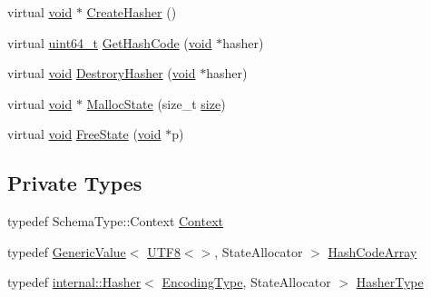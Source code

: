 \begin{DoxyCompactItemize}
\item 
virtual \hyperlink{imgui__impl__opengl3__loader_8h_ac668e7cffd9e2e9cfee428b9b2f34fa7}{void} $\ast$ \hyperlink{classGenericSchemaValidator_abc377481583ca2095fb784be88887faa}{Create\+Hasher} ()
\item 
virtual \hyperlink{stdint_8h_aec6fcb673ff035718c238c8c9d544c47}{uint64\+\_\+t} \hyperlink{classGenericSchemaValidator_ac01c45982a1f512e1ca06fe5544b0c0f}{Get\+Hash\+Code} (\hyperlink{imgui__impl__opengl3__loader_8h_ac668e7cffd9e2e9cfee428b9b2f34fa7}{void} $\ast$hasher)
\item 
virtual \hyperlink{imgui__impl__opengl3__loader_8h_ac668e7cffd9e2e9cfee428b9b2f34fa7}{void} \hyperlink{classGenericSchemaValidator_a007eef58be575dc562543d069ddd2710}{Destrory\+Hasher} (\hyperlink{imgui__impl__opengl3__loader_8h_ac668e7cffd9e2e9cfee428b9b2f34fa7}{void} $\ast$hasher)
\item 
virtual \hyperlink{imgui__impl__opengl3__loader_8h_ac668e7cffd9e2e9cfee428b9b2f34fa7}{void} $\ast$ \hyperlink{classGenericSchemaValidator_a7c999dfb3118aaa08495d60eee6d3732}{Malloc\+State} (size\+\_\+t \hyperlink{imgui__impl__opengl3__loader_8h_a3d1e3edfcf61ca2d831883e1afbad89e}{size})
\item 
virtual \hyperlink{imgui__impl__opengl3__loader_8h_ac668e7cffd9e2e9cfee428b9b2f34fa7}{void} \hyperlink{classGenericSchemaValidator_a4e250737a411af2969a9e585a7da4187}{Free\+State} (\hyperlink{imgui__impl__opengl3__loader_8h_ac668e7cffd9e2e9cfee428b9b2f34fa7}{void} $\ast$p)
\end{DoxyCompactItemize}
\subsection*{Private Types}
\begin{DoxyCompactItemize}
\item 
typedef Schema\+Type\+::\+Context \hyperlink{classGenericSchemaValidator_ac6403619afb8aa8729e1e15d8c34d350}{Context}
\item 
typedef \hyperlink{classGenericValue}{Generic\+Value}$<$ \hyperlink{structUTF8}{U\+T\+F8}$<$$>$, State\+Allocator $>$ \hyperlink{classGenericSchemaValidator_ae1cb713f267c2df2f8c5d4fbfe427ea4}{Hash\+Code\+Array}
\item 
typedef \hyperlink{classinternal_1_1Hasher}{internal\+::\+Hasher}$<$ \hyperlink{classGenericSchemaValidator_acf1c5361bb96da87d23167d8720b1ea5}{Encoding\+Type}, State\+Allocator $>$ \hyperlink{classGenericSchemaValidator_ab7df29495a3ba8f3f5dc828f90a40936}{Hasher\+Type}
\end{DoxyCompactItemize}
